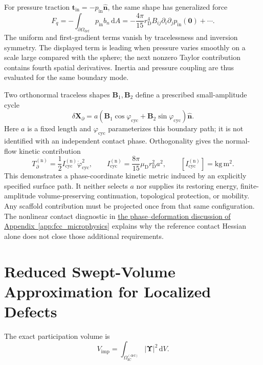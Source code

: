 For pressure traction $\mathbf t_{\mathrm{in}}=-p_{\mathrm{in}}\hat{\mathbf n}$, the same shape has generalized force
\[
 F_q=-\int_{\partial\Omega_{\mathrm{def}}}p_{\mathrm{in}}b_n\,\mathrm dA
 =-\frac{4\pi}{15}r_{\mathrm D}^{4}
 B_{ij}\partial_i\partial_jp_{\mathrm{in}}(\mathbf0)+\cdots.
\]
The uniform and first-gradient terms vanish by tracelessness and inversion symmetry. The displayed term is leading when pressure varies smoothly on a scale large compared with the sphere; the next nonzero Taylor contribution contains fourth spatial derivatives. Inertia and pressure coupling are thus evaluated for the same boundary mode.

Two orthonormal traceless shapes $\mathbf B_1,\mathbf B_2$ define a prescribed small-amplitude cycle
\[
 \delta\mathbf X_\partial
 =a(\mathbf B_1\cos\varphi_{\mathrm{cyc}}
     +\mathbf B_2\sin\varphi_{\mathrm{cyc}})\hat{\mathbf n}.
\]
Here $a$ is a fixed length and $\varphi_{\mathrm{cyc}}$ parameterizes this boundary path; it is not identified with an independent contact phase. Orthogonality gives the normal-flow kinetic contribution
\[
 T_\partial^{(\mathrm n)}
 =\frac12 I_{\mathrm{cyc}}^{(\mathrm n)}\dot\varphi_{\mathrm{cyc}}^2,
 \qquad I_{\mathrm{cyc}}^{(\mathrm n)}
 =\frac{8\pi}{15}\mu_{\mathrm D}r_{\mathrm D}^{2}a^2,
 \qquad [I_{\mathrm{cyc}}^{(\mathrm n)}]=\mathrm{kg\,m^2}.
\]
This demonstrates a phase-coordinate kinetic metric induced by an explicitly specified surface path. It neither selects $a$ nor supplies its restoring energy, finite-amplitude volume-preserving continuation, topological protection, or mobility. Any scaffold contribution must be projected once from that same configuration. The nonlinear contact diagnostic in \hyperref[sec:D_phase_deformation_diagnostic]{the phase--deformation discussion of Appendix~\ref*{app:fcc_microphysics}} explains why the reference contact Hessian alone does not close those additional requirements.

\section{Reduced Swept-Volume Approximation for Localized Defects}
\label{sec:AP_swept_volume}

The exact participation volume is
\begin{equation}
    V_{\mathrm{imp}}
    =
    \int_{\Omega_{\mathrm{IC}}^{(\mathrm{def})}}
    |\boldsymbol{\Upsilon}|^2
    \,
    \mathrm{d}V.
\end{equation}

